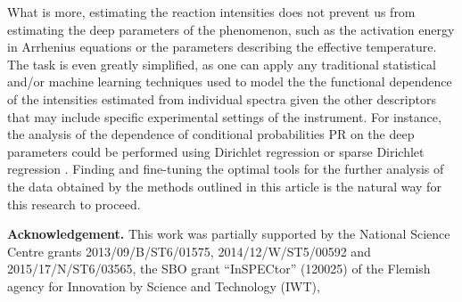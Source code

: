 \documentclass{llncs}
\begin{document}
        What is more, estimating the reaction intensities does not prevent us from estimating the deep parameters of the phenomenon, such as the activation energy in Arrhenius equations or the parameters describing the effective temperature. The task is even greatly simplified, as one can apply any traditional statistical and/or machine learning techniques used to model the the functional dependence of the intensities estimated from individual spectra given the other descriptors that may include specific experimental settings of the instrument. For instance, the analysis of the dependence of conditional probabilities PR on the deep parameters could be performed using Dirichlet regression or sparse Dirichlet regression \cite{Chen2013-zb}. Finding and fine-tuning the optimal tools for the further analysis of the data obtained by the methods outlined in this article is the natural way for this research to proceed.

\textbf{Acknowledgement.}
        This work was partially supported by the National Science Centre grants 2013/09/B/ST6/01575, 2014/12/W/ST5/00592 and 2015/17/N/ST6/03565, the SBO grant “InSPECtor” (120025) of the Flemish agency for Innovation by Science and Technology (IWT), 

{\tiny}
\end{document}
